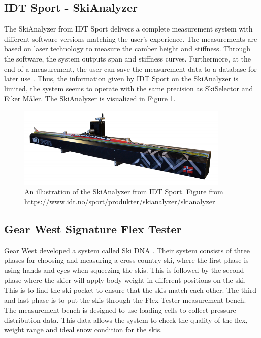 \subsection{IDT Sport - SkiAnalyzer}
\label{subsec:idt}
The SkiAnalyzer from IDT Sport delivers a complete measurement system with different software versions matching the user's experience. The measurements are based on laser technology to measure the camber height and stiffness. Through the software, the system outputs span and stiffness curves. Furthermore, at the end of a measurement, the user can save the measurement data to a database for later use \citep{idt_2018}. Thus, the information given by IDT Sport on the SkiAnalyzer is limited, the system seems to operate with the same precision as SkiSelector and Eiker Måler. The SkiAnalyzer is visualized in Figure \ref{fig:skianalyzer}.

\begin{figure}
    \centering
    \includegraphics[width=0.9\textwidth]{figures/skianalyzer.png}
    \caption{An illustration of the SkiAnalyzer from IDT Sport. Figure from \url{https://www.idt.no/sport/produkter/skianalyzer/skianalyzer}}
    \label{fig:skianalyzer}
\end{figure}

\subsection{Gear West Signature Flex Tester}
\label{subsec:gwsft}
Gear West developed a system called Ski DNA \citep{skidna_2018}. Their system consists of three phases for choosing and measuring a cross-country ski, where the first phase is using hands and eyes when squeezing the skis. This is followed by the second phase where the skier will apply body weight in different positions on the ski. This is to find the ski pocket to ensure that the skis match each other. The third and last phase is to put the skis through the Flex Tester measurement bench. The measurement bench is designed to use loading cells to collect pressure distribution data. This data allows the system to check the quality of the flex, weight range and ideal snow condition for the skis.

